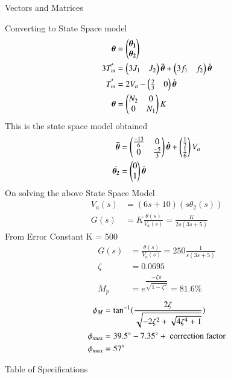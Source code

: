 \begin{table}[!ht]
\centering

\caption{Vectors and Matrices}
\label{table:ee18btech11001_3}
\end{table}    
Converting to State Space model
\begin{align}
    \bm{\theta} &= \begin{pmatrix}\bm{\theta_{1}} \\ \bm{\theta_{2}}\end{pmatrix}
    \\
    3 \Vec{T_{m}} &= \begin{pmatrix}3J_{1} & J_{2}\end{pmatrix}\bm{\Ddot{\theta}}+ \begin{pmatrix}3f_{1} & f_{2}\end{pmatrix}\bm{\dot{\theta}}
    \\
    \Vec{T_{m}} &= 2V_{a} - \begin{pmatrix}\frac{2}{3} & 0\end{pmatrix}\bm{\dot{\theta}}
    \\
    \bm{\theta} &= \begin{pmatrix}N_{2} & 0 \\ 0& N_{1}\end{pmatrix} K
\end{align}
This is the state space model obtained
\begin{align}
    \bm{\Ddot{\theta}} &= \begin{pmatrix}\frac{-13}{6} & 0 \\ 0 &\frac{-5}{3}\end{pmatrix}\bm{\Dot{\theta}} + \begin{pmatrix}\frac{1}{2} \\ \frac{1}{6}\end{pmatrix}V_{a}
    \\
    \bm{\dot{\theta_{2}}} &= \begin{pmatrix}0 \\ 1\end{pmatrix}\bm{\dot{\theta}} 
\end{align}
On solving the above State Space Model
\begin{align}
    V_{a}(s) &= (6s+10)(s\theta_{2}(s)) \label{eq:ee18btech11001_6}
    \\
    G(s) &=  K \frac{\theta (s)}{V_{a}(s)} = \frac{K}{2s(3s+5)} \label{eq:ee18btech11001_7}
\end{align}
From Error Constant  K = 500
\begin{align}
   G(s) &=  \frac{\theta (s)}{V_{a}(s)} = 250 \frac{1}{s(3s+5)} \label{eq:ee18btech11001_8}
   \\
   \zeta &= 0.0695
   \\
   M_{p} &= e^{\dfrac{-\zeta\pi}{\sqrt{1-\zeta^{2}}}} = 81.6\%
\end{align}
\begin{align}
   \phi_{M} &= \tan^{-1}(\dfrac{2\zeta}{\sqrt{-2\zeta^2 + \sqrt{4\zeta^4 + 1}}})
   \\
   \phi_{max} &= 39.5\degree-7.35\degree+ \text{ correction factor}
   \\
   \phi_{max} &= 57\degree
\end{align}
\begin{table}[!ht]
\centering

\caption{Table of Specifications}
\label{table:ee18btech11001}
\end{table}

